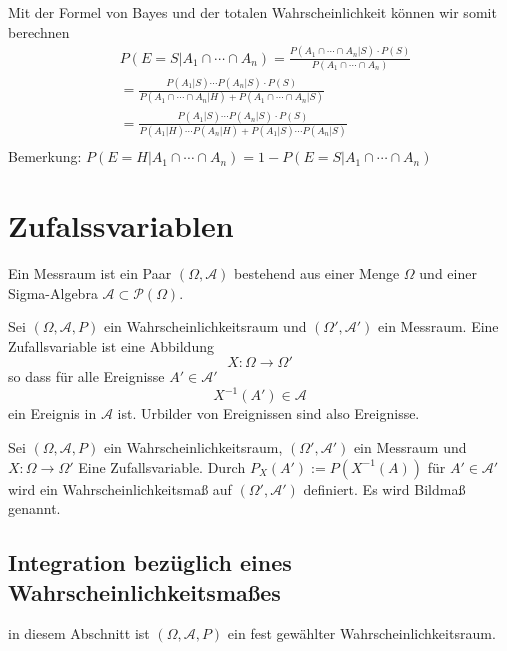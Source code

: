 Mit der Formel von Bayes und der totalen Wahrscheinlichkeit  können wir somit berechnen
\begin{align*}
& P(E=S |  A_1 \cap \cdots \cap A_n) = \frac{P(A_1 \cap \cdots \cap A_n | S) \cdot P(S)}{P(A_1 \cap \cdots \cap A_n)} \\
&=  \frac{P(A_1 | S) \cdots P(A_n | S) \cdot P(S)}{P(A_1 \cap \cdots \cap A_n | H) + P(A_1 \cap \cdots \cap A_n | S)} \\
&=  \frac{P(A_1 | S) \cdots P(A_n | S) \cdot P(S)}{P(A_1 | H) \cdots P(A_n | H)  + P(A_1 | S) \cdots P(A_n | S) } \\
\end{align*}
Bemerkung: $P(E=H |  A_1 \cap \cdots \cap A_n) = 1- P(E=S |  A_1 \cap \cdots \cap A_n) $


\section{Zufalssvariablen}

\begin{Definition}
Ein Messraum ist ein Paar $(\Omega, \mathcal{A})$ bestehend aus einer Menge $\Omega$ und einer Sigma-Algebra $\mathcal{A} \subset \mathcal{P}(\Omega)$.
\end{Definition}



\begin{Definition}
Sei $(\Omega, \mathcal{A}, P)$ ein Wahrscheinlichkeitsraum und $(\Omega', \mathcal{A}')$ ein Messraum. Eine Zufallsvariable ist eine Abbildung
$$X : \Omega \to \Omega'$$ 
so dass für alle Ereignisse $A' \in  \mathcal{A}'$
$$ X^{-1} (A') \in \mathcal{A}$$
 ein Ereignis in $\mathcal{A}$ ist. Urbilder von Ereignissen sind also Ereignisse.
\end{Definition}

\begin{Definition}
Sei $(\Omega, \mathcal{A}, P)$ ein Wahrscheinlichkeitsraum, $(\Omega', \mathcal{A}')$ ein Messraum und  $X : \Omega \to \Omega'$  Eine Zufallsvariable. 
Durch $P_X (A') := P(X^{-1} (A))$ für $A' \in \mathcal{A}'$ wird ein Wahrscheinlichkeitsmaß auf  $(\Omega', \mathcal{A}')$ definiert. Es wird Bildmaß genannt.
\end{Definition}



\subsection{Integration bezüglich eines Wahrscheinlichkeitsmaßes}
in diesem Abschnitt ist  $(\Omega, \mathcal{A},P)$ ein fest gewählter Wahrscheinlichkeitsraum.

